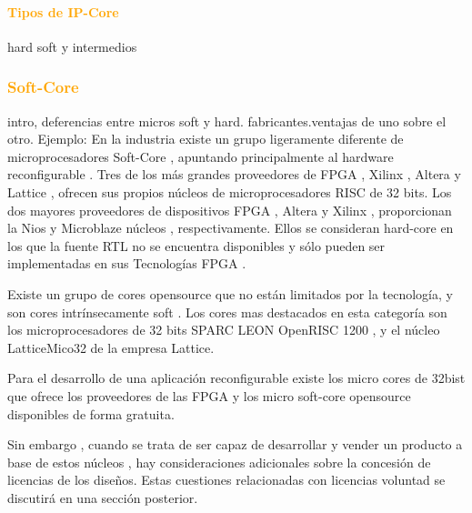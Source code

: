\documentclass[a4paper,11pt]{article}
\begin{document}
			\paragraph{\textcolor{orange}{ Tipos de IP-Core}}
hard soft y intermedios

		\subsubsection{\textcolor{orange}{Soft-Core}}%
 intro,  deferencias entre micros soft y hard. fabricantes.ventajas de uno sobre el otro.
 Ejemplo:
En la industria existe un grupo ligeramente diferente de microprocesadores  Soft-Core , apuntando principalmente al hardware reconfigurable . Tres de los más grandes proveedores de FPGA , Xilinx , Altera y Lattice , ofrecen sus propios núcleos de microprocesadores RISC de 32 bits. Los dos mayores proveedores de dispositivos FPGA , Altera y Xilinx , proporcionan la Nios y Microblaze núcleos , respectivamente. Ellos se consideran hard-core en los que la fuente RTL no se encuentra  disponibles y sólo pueden ser implementadas en sus  Tecnologías FPGA .

Existe un grupo de cores opensource que no están limitados por la tecnología, y
son cores intrínsecamente soft . Los cores mas destacados en esta categoría son los  microprocesadores de 32 bits  SPARC LEON OpenRISC 1200 , y el núcleo LatticeMico32 de la empresa Lattice.

Para el desarrollo de una aplicación reconfigurable existe los micro cores de 32bist que ofrece los proveedores de las FPGA y los micro soft-core opensource disponibles de forma gratuita.

 Sin embargo , cuando se trata de ser capaz de desarrollar y vender un producto a base de estos núcleos , hay consideraciones adicionales sobre la concesión de licencias de los diseños. Estas cuestiones relacionadas con licencias voluntad se discutirá en una sección posterior.
\end{document}
